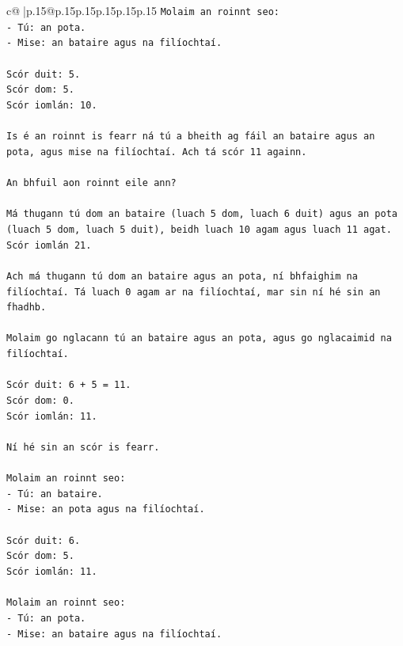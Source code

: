 \documentclass{article}
\begin{document}
{\begin{supertabular}{c@{$\;$}|p{.15\linewidth}@{}p{.15\linewidth}p{.15\linewidth}p{.15\linewidth}p{.15\linewidth}p{.15\linewidth}}
{{{\texttt{Molaim an roinnt seo:} \\
\texttt{{-} Tú: an pota.} \\
\texttt{{-} Mise: an bataire agus na filíochtaí.} \\
\\ 
\texttt{Scór duit: 5.} \\
\texttt{Scór dom: 5.} \\
\texttt{Scór iomlán: 10.} \\
\\ 
\texttt{Is é an roinnt is fearr ná tú a bheith ag fáil an bataire agus an pota, agus mise na filíochtaí. Ach tá scór 11 againn.} \\
\\ 
\texttt{An bhfuil aon roinnt eile ann?} \\
\\ 
\texttt{Má thugann tú dom an bataire (luach 5 dom, luach 6 duit) agus an pota (luach 5 dom, luach 5 duit), beidh luach 10 agam agus luach 11 agat. Scór iomlán 21.} \\
\\ 
\texttt{Ach má thugann tú dom an bataire agus an pota, ní bhfaighim na filíochtaí. Tá luach 0 agam ar na filíochtaí, mar sin ní hé sin an fhadhb.} \\
\\ 
\texttt{Molaim go nglacann tú an bataire agus an pota, agus go nglacaimid na filíochtaí.} \\
\\ 
\texttt{Scór duit: 6 + 5 = 11.} \\
\texttt{Scór dom: 0.} \\
\texttt{Scór iomlán: 11.} \\
\\ 
\texttt{Ní hé sin an scór is fearr.} \\
\\ 
\texttt{Molaim an roinnt seo:} \\
\texttt{{-} Tú: an bataire.} \\
\texttt{{-} Mise: an pota agus na filíochtaí.} \\
\\ 
\texttt{Scór duit: 6.} \\
\texttt{Scór dom: 5.} \\
\texttt{Scór iomlán: 11.} \\
\\ 
\texttt{Molaim an roinnt seo:} \\
\texttt{{-} Tú: an pota.} \\
\texttt{{-} Mise: an bataire agus na filíochtaí.} \\
}}}
\end{supertabular}}
\end{document}
